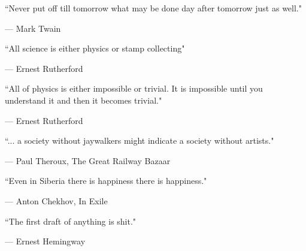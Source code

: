 \documentclass{report}
\begin{document}
\epigraph{``Never put off till tomorrow what may be done day after tomorrow just as well."}{--- \textup{Mark Twain}}

\epigraph{``All science is either physics or stamp collecting"}{--- \textup{Ernest Rutherford}}

\epigraph{``All of physics is either impossible or trivial. It is impossible until you understand it and then it becomes trivial."}{--- \textup{Ernest Rutherford}}

\epigraph{``... a society without jaywalkers might indicate a society without artists."}{--- \textup{Paul Theroux}, The Great Railway Bazaar}

\epigraph{``Even in Siberia there is happiness there is happiness."}{--- \textup{Anton Chekhov}, In Exile}

\epigraph{``The first draft of anything is shit."}{--- \textup{Ernest Hemingway}}
\end{document}
